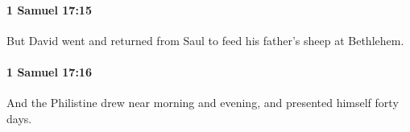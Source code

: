 		\paragraph{1 Samuel 17:15} %
			\label{1SAMUEL-17-15}

			But David went and returned from Saul to feed his father’s sheep at Bethlehem.


		\paragraph{1 Samuel 17:16} %
			\label{1SAMUEL-17-16}

			And the Philistine drew near morning and evening, and presented himself forty days.


